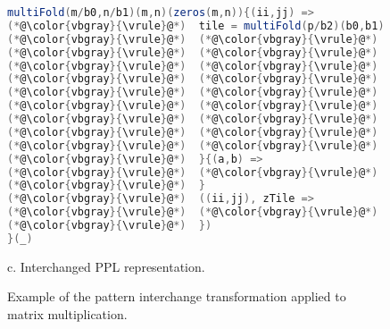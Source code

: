 \begin{figure}
\begin{lstlisting}[language=Scala,numbers=none,basicstyle=\fontsize{9}{10}\beramonott]
multiFold(m/b0,n/b1)(m,n)(zeros(m,n)){(ii,jj) =>
(*@\color{vbgray}{\vrule}@*)  tile = multiFold(p/b2)(b0,b1)(...){kk =>
(*@\color{vbgray}{\vrule}@*)  (*@\color{vbgray}{\vrule}@*)  xTile = x.copy(b0 + ii, b2 + kk)
(*@\color{vbgray}{\vrule}@*)  (*@\color{vbgray}{\vrule}@*)  yTile = y.copy(b2 + kk, b1 + jj)
(*@\color{vbgray}{\vrule}@*)  (*@\color{vbgray}{\vrule}@*)  (0, elemTile =>
(*@\color{vbgray}{\vrule}@*)  (*@\color{vbgray}{\vrule}@*)  (*@\color{vbgray}{\vrule}@*)  map(b0,b1){(i,j) =>
(*@\color{vbgray}{\vrule}@*)  (*@\color{vbgray}{\vrule}@*)  (*@\color{vbgray}{\vrule}@*)  (*@\color{vbgray}{\vrule}@*)  dprod = fold(b2)(0){ k =>
(*@\color{vbgray}{\vrule}@*)  (*@\color{vbgray}{\vrule}@*)  (*@\color{vbgray}{\vrule}@*)  (*@\color{vbgray}{\vrule}@*)  (*@\color{vbgray}{\vrule}@*)  acc => acc + xTile(i,j) * yTile(j,k)
(*@\color{vbgray}{\vrule}@*)  (*@\color{vbgray}{\vrule}@*)  (*@\color{vbgray}{\vrule}@*)  (*@\color{vbgray}{\vrule}@*)  }{(a,b) => a + b}
(*@\color{vbgray}{\vrule}@*)  (*@\color{vbgray}{\vrule}@*)  (*@\color{vbgray}{\vrule}@*)  (*@\color{vbgray}{\vrule}@*)  elemTile(i,j) + dprod
(*@\color{vbgray}{\vrule}@*)  (*@\color{vbgray}{\vrule}@*)  })
(*@\color{vbgray}{\vrule}@*)  }{(a,b) =>
(*@\color{vbgray}{\vrule}@*)  (*@\color{vbgray}{\vrule}@*)  map(b0,b1){(i,j) => a(i,j) + b(i,j)
(*@\color{vbgray}{\vrule}@*)  }
(*@\color{vbgray}{\vrule}@*)  ((ii,jj), zTile =>
(*@\color{vbgray}{\vrule}@*)  (*@\color{vbgray}{\vrule}@*)  map(b0,b1){(i,j) => zTile(i,j) + tile(i,j)}
(*@\color{vbgray}{\vrule}@*)  })
}(_)
\end{lstlisting}
c. Interchanged PPL representation.

\caption{Example of the pattern interchange transformation applied to matrix multiplication.}
\label{fig:interchange-examples}
\end{figure}
